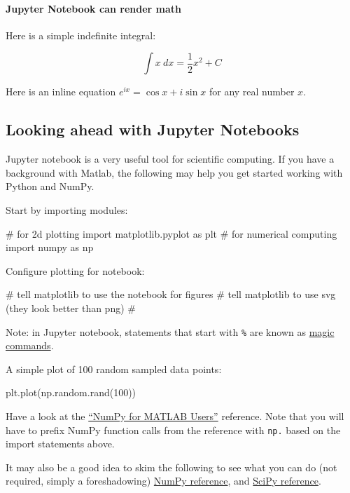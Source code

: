 \documentclass[12pt,letterpaper,twoside]{article}
\begin{document}
\paragraph{Jupyter Notebook can render math}

Here is a simple indefinite integral:

\[
\int x\ dx = \frac{1}{2} x^2 + C
\]

Here is an inline equation \(e^{ix} = \cos x + i \sin x\) for any real
number \(x\).

\subsection{Looking ahead with Jupyter Notebooks}

Jupyter notebook is a very useful tool for scientific computing. If you
have a background with Matlab, the following may help you get started
working with Python and NumPy.

Start by importing modules:

\begin{python}
# for 2d plotting
import matplotlib.pyplot as plt
# for numerical computing
import numpy as np
\end{python}

Configure plotting for notebook:

\begin{python}
# tell matplotlib to use the notebook for figures
# tell matplotlib to use svg (they look better than png)
#%
\end{python}

Note: in Jupyter notebook, statements that start with \texttt{\%} are
known as
\href{http://ipython.readthedocs.io/en/stable/interactive/magics.html}{magic
commands}.

A simple plot of 100 random sampled data points:

\begin{python}
plt.plot(np.random.rand(100))
\end{python}

Have a look at the
\href{http://mathesaurus.sourceforge.net/matlab-numpy.html}{``NumPy for
MATLAB Users''} reference. Note that you will have to prefix NumPy
function calls from the reference with \texttt{np.} based on the import
statements above.

It may also be a good idea to skim the following to see what you can
do (not required, simply a foreshadowing)
  \href{http://docs.scipy.org/doc/numpy/reference/}{NumPy reference}, and
  \href{http://docs.scipy.org/doc/scipy/reference/}{SciPy reference}.
 
\end{document}
